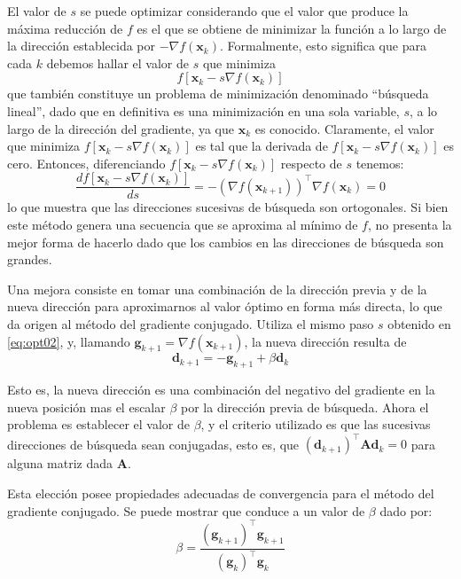 El valor de $s$ se puede optimizar considerando que el valor que produce la máxima reducción de $f$ es el que se obtiene de minimizar la función a lo largo de la dirección establecida por $-\nabla f(\bm{x}_k)$. Formalmente, esto significa que para cada $k$ debemos hallar el valor de $s$ que minimiza
\begin{equation}
 f[\bm{x}_k - s \nabla f(\bm{x}_k)] 
 \label{eq:opt02}
 \end{equation}
que también constituye un problema de minimización denominado ``búsqueda lineal'', dado que en definitiva es una minimización en una sola variable, $s$, a lo largo de la dirección del gradiente, ya que $\bm{x}_k$ es conocido. Claramente, el valor que minimiza $f[\bm{x}_k - s \nabla f(\bm{x}_k)]$ es tal que la derivada de $f[\bm{x}_k - s \nabla f(\bm{x}_k)]$ es cero. Entonces, diferenciando $f[\bm{x}_k - s \nabla f(\bm{x}_k)]$ respecto de $s$ tenemos:
\[ \frac{d f[\bm{x}_k - s \nabla f(\bm{x}_k)]}{ds} = -\left( \nabla f(\bm{x}_{k+1}) \right)^{\intercal} \nabla f(\bm{x}_k) = 0 \]
lo que muestra que las direcciones sucesivas de búsqueda son ortogonales. Si bien este método genera una secuencia que se aproxima al mínimo de $f$, no presenta la mejor forma de hacerlo dado que los cambios en las direcciones de búsqueda son grandes. 

Una mejora consiste en tomar una combinación de la dirección previa y de la nueva dirección para aproximarnos al valor óptimo en forma más directa, lo que da origen al método del gradiente conjugado. Utiliza el mismo paso $s$ obtenido en \eqref{eq:opt02}, y, llamando $\bm{g}_{k+1} = \nabla f(\bm{x}_{k+1})$, la nueva dirección resulta de
\[ \bm{d}_{k+1} = -\bm{g}_{k+1} + \beta \bm{d}_k \]

Esto es, la nueva dirección es una combinación del negativo del gradiente en la nueva posición mas el escalar $\beta$ por la dirección previa de búsqueda. Ahora el problema es establecer el valor de $\beta$, y el criterio utilizado es que las sucesivas direcciones de búsqueda sean conjugadas, esto es, que $(\bm{d}_{k+1})^{\intercal} \bm{A} \bm{d}_k = 0$ para alguna matriz dada $\bm{A}$.

Esta elección posee propiedades adecuadas de convergencia para el método del gradiente conjugado. Se puede mostrar que conduce a un valor de $\beta$ dado por:
\[ \beta = \frac{(\bm{g}_{k+1})^{\intercal} \bm{g}_{k+1}}{(\bm{g}_{k})^{\intercal} \bm{g}_k} \]

